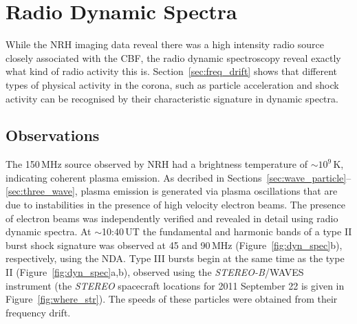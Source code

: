 \section{Radio Dynamic Spectra}\label{sec:20}

While the NRH imaging data reveal there was a high intensity radio source closely associated with the CBF, the radio dynamic spectroscopy reveal exactly what kind of radio activity this is. Section~\ref{sec:freq_drift} shows that different types of physical activity in the corona, such as particle acceleration and shock activity can be recognised by their characteristic signature in dynamic spectra. 

\subsection{Observations}
The 150\,MHz source observed by NRH had a brightness temperature of $\sim$$10^9$\,K, indicating coherent plasma emission. As decribed in Sections~\ref{sec:wave_particle}--\ref{sec:three_wave}, plasma emission is generated via plasma oscillations that are due to instabilities in the presence of high velocity electron beams. The presence of electron beams was independently verified and revealed in detail using radio dynamic spectra. At $\sim$10:40\,UT the fundamental and harmonic bands of a type II burst shock signature was observed at 45 and 90\,MHz (Figure~\ref{fig:dyn_spec}b), respectively, using the NDA. Type III bursts begin at the same time as the type II (Figure~\ref{fig:dyn_spec}a,b), observed using the \emph{STEREO-B}/WAVES instrument (the \emph{STEREO} spacecraft locations for 2011 September 22 is given in Figure~\ref{fig:where_str}). The speeds of these particles were obtained from their frequency drift.

